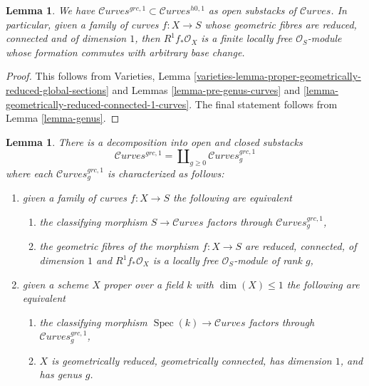 \documentclass{stacks-project}
\theoremstyle{plain}
\newtheorem{lemma}[subsection]{Lemma}
\theoremstyle{definition}
\theoremstyle{remark}
\numberwithin{equation}{subsection}
\def\Spec{\mathop{\mathrm{Spec}}}
\def\Curvesstack{\mathcal{C}\!\mathit{urves}}
\begin{document}
\begin{lemma}
\label{lemma-geomredcon-in-h0-1}
We have $\Curvesstack^{grc, 1} \subset \Curvesstack^{h0, 1}$
as open substacks of $\Curvesstack$. In particular, given
a family of curves $f : X \to S$
whose geometric fibres are reduced, connected and of dimension $1$, then
$R^1f_*\mathcal{O}_X$ is a finite locally free $\mathcal{O}_S$-module
whose formation commutes with arbitrary base change.
\end{lemma}

\begin{proof}
This follows from Varieties, Lemma
\ref{varieties-lemma-proper-geometrically-reduced-global-sections}
and Lemmas \ref{lemma-pre-genus-curves} and
\ref{lemma-geometrically-reduced-connected-1-curves}.
The final statement follows from Lemma \ref{lemma-genus}.
\end{proof}

\begin{lemma}
\label{lemma-one-piece-per-genus}
There is a decomposition into open and closed substacks
$$
\Curvesstack^{grc, 1} = \coprod\nolimits_{g \geq 0} \Curvesstack^{grc, 1}_g
$$
where each $\Curvesstack^{grc, 1}_g$ is characterized as follows:
\begin{enumerate}
\item given a family of curves $f : X \to S$ the following are equivalent
\begin{enumerate}
\item the classifying morphism $S \to \Curvesstack$ factors
through $\Curvesstack^{grc, 1}_g$,
\item the geometric fibres of the morphism $f : X \to S$ are
reduced, connected, of dimension $1$ and
$R^1f_*\mathcal{O}_X$ is a locally free $\mathcal{O}_S$-module
of rank $g$,
\end{enumerate}
\item given a scheme $X$ proper over a field $k$ with $\dim(X) \leq 1$
the following are equivalent
\begin{enumerate}
\item the classifying morphism $\Spec(k) \to \Curvesstack$ factors
through $\Curvesstack^{grc, 1}_g$,
\item $X$ is geometrically reduced, geometrically connected,
has dimension $1$, and has genus $g$.
\end{enumerate}
\end{enumerate}
\end{lemma}
\end{document}

